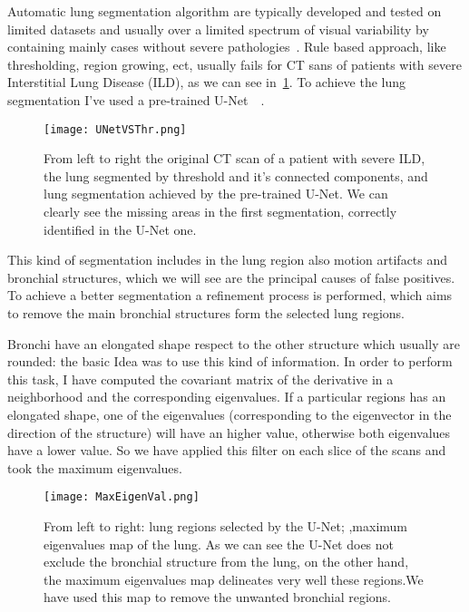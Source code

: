 \documentclass{standalone}
\begin{document}
	Automatic lung segmentation algorithm are typically developed and tested on limited datasets and usually over a limited spectrum of visual variability by containing mainly cases without severe pathologies~\cite{ART:Johannes}. Rule based approach, like thresholding, region growing, ect, usually fails for CT sans of patients with severe Interstitial Lung Disease (ILD), as we can see in \figurename\,\ref{fig:UNetVSThr}. To achieve the lung segmentation I've used a pre-trained U-Net~\cite{ART:Johannes}~\cite{REP:lungmask}. 
	\begin{figure}[h!]
		\centering
		\texttt{[image: UNetVSThr.png]}
		\caption{From left to right the original CT scan of a patient with severe ILD, the lung segmented by threshold and it's connected components, and lung segmentation achieved by the pre-trained U-Net. We can clearly see the missing areas in the first segmentation, correctly identified in the U-Net one.}\label{fig:UNetVSThr}
		
	\end{figure}
	
	This kind of segmentation includes in the lung region also motion artifacts and bronchial structures, which we will see are the principal causes of false positives. To achieve a better segmentation a refinement process is performed, which aims to remove the main bronchial structures form the selected lung regions. 
	
	Bronchi have an elongated shape respect to the other structure which usually are rounded: the basic Idea was to use this kind of information. In order to perform this task, I have  computed the covariant matrix of the derivative in a neighborhood and the corresponding eigenvalues. If a particular regions has an elongated shape, one of the eigenvalues (corresponding to the eigenvector in the direction of the structure) will have an higher value, otherwise both eigenvalues have a lower value. So we have applied this filter on each slice of the scans and took the maximum eigenvalues. 
	\begin{figure}[h!]
		\centering
		\texttt{[image: MaxEigenVal.png]}
		\caption{From left to right: lung regions selected by the U-Net; ,maximum eigenvalues map of the lung. As we can see the U-Net does not exclude the bronchial structure from the lung, on the other hand, the maximum eigenvalues map delineates very well these regions.We have used this map to remove the unwanted bronchial regions.}\label{fig:MaxEigenval}
	\end{figure}
	
\end{document}
